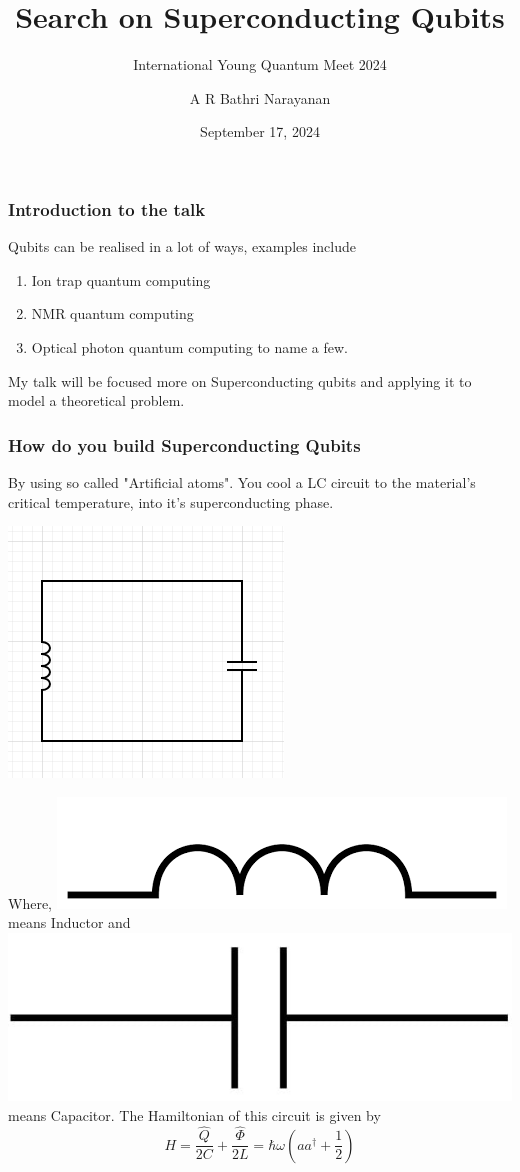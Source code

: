 \documentclass[11pt]{beamer}
\begin{document}
	\author{A R Bathri Narayanan}
	\title{Search on Superconducting Qubits}
	\subtitle{International Young Quantum Meet 2024}
	\date{September 17, 2024}
	\subject{}
	\begin{frame}[plain]
		\maketitle
	\end{frame}
	
	\begin{frame}
		\frametitle{Introduction to the talk}
		Qubits can be realised in a lot of ways, examples include
		\begin{enumerate}
			\item  Ion trap quantum computing
			\item NMR quantum computing
			\item Optical photon quantum computing to name a few.
		\end{enumerate}
	My talk will be focused more on Superconducting qubits and applying it to model a theoretical problem.
	\end{frame}
	
		\begin{frame}
		\frametitle{How do you build Superconducting Qubits}
		By using so called "Artificial atoms". You cool a LC circuit to the material's critical temperature, into it's superconducting phase.\\
		\begin{center}
		\includegraphics[width=3 cm]{sc1.png}
		\end{center}
		Where,
		\includegraphics[width=1 cm]{sc2.png} means Inductor and \includegraphics[width=1 cm]{sc3.jpg} means Capacitor. The Hamiltonian of this circuit is given by
		\[H=\frac{\hat{Q}}{2C}+\frac{\hat{\Phi}}{2L}=\hbar\omega(aa^{\dagger}+\frac{1}{2})\]
		\end{frame}
		
\end{document}
